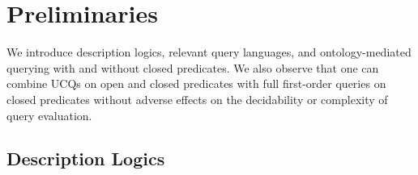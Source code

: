 \documentclass{lmcs}
\theoremstyle{definition}
\begin{document}
\section{Preliminaries}\label{sect:prelim}







We introduce description logics, relevant query languages, and
ontology-mediated querying with and without closed predicates. We also
observe that one can combine UCQs on open and closed predicates with
full first-order queries on closed predicates without adverse effects on
the decidability or complexity of query evaluation.

\subsection{Description Logics}
\end{document}
